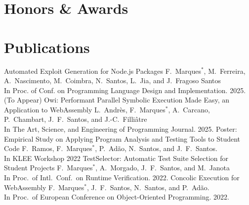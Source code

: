 \documentclass[11pt,a4paper,sans]{moderncv}   %
\begin{document}
\section{Honors \& Awards}


\section{Publications}
%
{Automated Exploit Generation for Node.js Packages}{}{}{}%
{F.\ Marques$^\ast$,
  M.\ Ferreira,
  A.\ Nascimento,
  M.\ Coimbra,
  N.\ Santos,
  L.\ Jia, and
  J.\ Fragoso Santos \\
In Proc. of Conf. on Programming Language Design and Implementation. 2025. (To Appear)
}
%
%
%
{Owi: Performant Parallel Symbolic Execution Made Easy, an Application to WebAssembly}{}{}{}%
{L.\ Andr\`{e}s,
  F.\ Marques$^\ast$,
  A.\ Carcano,
  P.\ Chambart,
  J.\ F.\ Santos, and
  J.-C.\ Filli\^{a}tre \\
In The Art, Science, and Engineering of Programming Journal. 2025.
}
%
%
{Poster: Empirical Study on Applying Program Analysis and Testing Tools to Student Code}{}{}{}%
{F.\ Ramos,
  F.\ Marques$^\ast$,
  P.\ Ad\~ao,
  N.\ Santos, and
  J.\ F.\ Santos. \\
In KLEE Workshop 2022
}
%
%
{TestSelector: Automatic Test Suite Selection for Student Projects}{}{}{}%
{F.\ Marques$^\ast$,
  A.\ Morgado,
  J.\ F.\ Santos, and
  M.\ Janota \\
In Proc.\ of Intl.\ Conf.\ on Runtime Verification. 2022.
}
%
%
{Concolic Execution for WebAssembly}{}{}{}%
{F.\ Marques$^\ast$, J.\ F.\ Santos, N.\ Santos, and P.\ Ad\~ao.\\
In Proc.\ of European Conference on Object-Oriented Programming. 2022.
}
\end{document}
